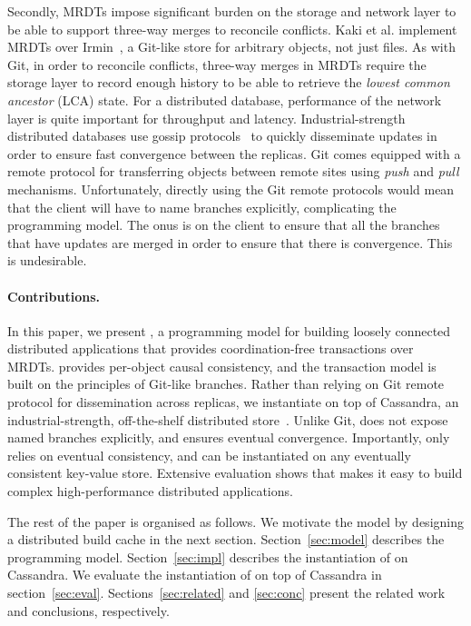 Secondly, MRDTs impose significant burden on the storage and network layer
to be able to support three-way merges to reconcile conflicts. Kaki et al.
implement MRDTs over Irmin~\cite{Irmin}, a Git-like store for arbitrary
objects, not just files. As with Git, in order to reconcile conflicts,
three-way merges in MRDTs require the storage layer to record enough history to
be able to retrieve the \emph{lowest common ancestor} (LCA) state. For a
distributed database, performance of the network layer is quite important for
throughput and latency. Industrial-strength distributed databases use gossip
protocols~\cite{Kermarrec07} to quickly disseminate updates in order to ensure
fast convergence between the replicas. Git comes equipped with a remote
protocol for transferring objects between remote sites using \emph{push} and
\emph{pull} mechanisms. Unfortunately, directly using the Git remote protocols
would mean that the client will have to name branches explicitly, complicating
the programming model. The onus is on the client to ensure that all the
branches that have updates are merged in order to ensure that there is
convergence. This is undesirable.

\paragraph*{\textbf{Contributions.}} In this paper, we present \name, a
programming model for building loosely connected distributed applications that provides
coordination-free transactions over MRDTs. \name provides per-object causal
consistency, and the transaction model is built on the principles of Git-like
branches. Rather than relying on Git remote protocol for dissemination across
replicas, we instantiate \name on top of Cassandra, an industrial-strength,
off-the-shelf distributed store~\cite{10.1145/1773912.1773922}. Unlike Git,
\name does not expose named branches explicitly, and ensures eventual
convergence. Importantly, \name only relies on eventual consistency, and \name
can be instantiated on any eventually consistent key-value store. Extensive
evaluation shows that \name makes it easy to build complex high-performance
distributed applications.

The rest of the paper is organised as follows. We motivate the \name model by
designing a distributed build cache in the next section.
Section~\ref{sec:model} describes the \name programming model.
Section~\ref{sec:impl} describes the instantiation of \name on Cassandra. We
evaluate the instantiation of \name on top of Cassandra in
section~\ref{sec:eval}. Sections~\ref{sec:related} and \ref{sec:conc} present
the related work and conclusions, respectively.
